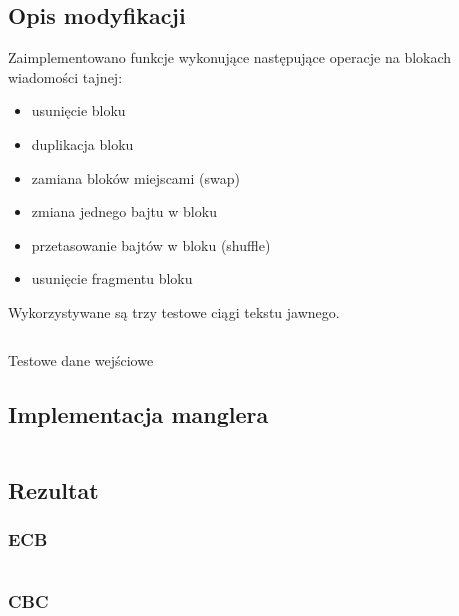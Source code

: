 \documentclass[12pt]{article}
\newenvironment*{dummyenv}{}{}
\begin{document}
\subsection{Opis modyfikacji}

Zaimplementowano funkcje wykonujące następujące operacje na blokach
wiadomości tajnej:

\begin{itemize}
	\item usunięcie bloku
	\item duplikacja bloku
	\item zamiana bloków miejscami (swap)
	\item zmiana jednego bajtu w bloku
	\item przetasowanie bajtów w bloku (shuffle)
	\item usunięcie fragmentu bloku
\end{itemize}

Wykorzystywane są trzy testowe ciągi tekstu jawnego.

\begin{listing}[H]
	\inputminted[firstline=20,lastline=24]{python}{../aes_tests.py}
	\caption{Testowe dane wejściowe}
\end{listing}

\newpage

\subsection{Implementacja manglera}

\inputminted[firstline=72,lastline=165]{python}{../aes_tests.py}

\subsection{Rezultat}

\subsubsection{ECB}

\begin{dummyenv}
	\inputminted[breaklines,firstline=1,lastline=51]{yaml}{2-mangled-ecb.txt}
\end{dummyenv}

\subsubsection{CBC}

\begin{dummyenv}
	\inputminted[breaklines,firstline=1,lastline=51]{yaml}{2-mangled-cbc.txt}
\end{dummyenv}
\end{document}

